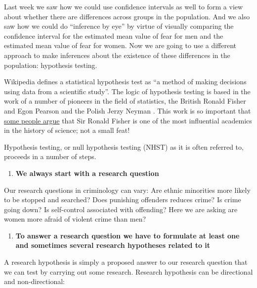 \documentclass[
]{book}
\providecommand{\tightlist}{%
  \setlength{\itemsep}{0pt}\setlength{\parskip}{0pt}}
\begin{document}
Last week we saw how we could use confidence intervals as well to form a view about whether there are differences across groups in the population. And we also saw how we could do ``inference by eye'' by virtue of visually comparing the confidence interval for the estimated mean value of fear for men and the estimated mean value of fear for women. Now we are going to use a different approach to make inferences about the existence of these differences in the population: hypothesis testing.

Wikipedia defines a statistical hypothesis test as ``a method of making decisions using data from a scientific study''. The logic of hypothesis testing is based in the work of a number of pioneers in the field of statistics, the British Ronald Fisher and Egon Pearson and the Polish Jerzy Neyman . This work is so important that \href{http://simplystatistics.org/2012/03/07/r-a-fisher-is-the-most-influential-scientist-ever/}{some people argue} that Sir Ronald Fisher is one of the most influential academics in the history of science; not a small feat!

Hypothesis testing, or null hypothesis testing (NHST) as it is often referred to, proceeds in a number of steps.

\begin{enumerate}
\def\labelenumi{\arabic{enumi}.}
\tightlist
\item
  \textbf{We always start with a research question}
\end{enumerate}

Our research questions in criminology can vary: Are ethnic minorities more likely to be stopped and searched? Does punishing offenders reduces crime? Is crime going down? Is self-control associated with offending? Here we are asking are women more afraid of violent crime than men?

\begin{enumerate}
\def\labelenumi{\arabic{enumi}.}
\setcounter{enumi}{1}
\tightlist
\item
  \textbf{To answer a research question we have to formulate at least one and sometimes several research hypotheses related to it}
\end{enumerate}

A research hypothesis is simply a proposed answer to our research question that we can test by carrying out some research. Research hypothesis can be directional and non-directional:
\end{document}
